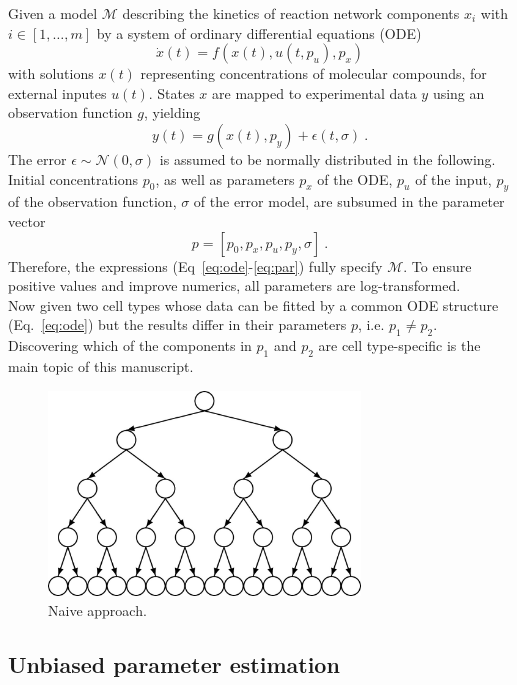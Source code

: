 \documentclass{bioinfo}
\begin{document}
Given a model $\mathcal M$ describing the kinetics of reaction network components $x_i$ with $i \in [1,\dots,m]$ by a system of ordinary differential equations (ODE)
\begin{equation}
\dot x(t) = f(x(t),u(t,p_u),p_x)\label{eq:ode}
\end{equation}
with solutions $x(t)$ representing concentrations of molecular compounds, for external inputes $u(t)$.
States $x$ are mapped to experimental data $y$ using an observation function $g$, yielding
\begin{equation}
y(t) = g(x(t),p_y)+\epsilon(t,\sigma) \:.\label{eq:obs}
\end{equation}
The error $\epsilon \sim \mathcal N(0,\sigma)$ is assumed to be normally distributed in the following.
Initial concentrations $p_0$, as well as parameters $p_x$ of the ODE, $p_u$ of the input, $p_y$ of the observation function, $\sigma$ of the error model, are subsumed in the parameter vector
\begin{equation}
p = [p_0, p_x, p_u, p_y, \sigma] \:.\label{eq:par}
\end{equation}
Therefore, the expressions (Eq~\ref{eq:ode}-\ref{eq:par}) fully specify $\mathcal M$.
To ensure positive values and improve numerics, all parameters are log-transformed.\\
Now given two cell types whose data can be fitted by a common ODE structure (Eq.~\ref{eq:ode}) but the results differ in their parameters $p$, i.e. $p_1 \neq p_2$.
Discovering which of the components in $p_1$ and $p_2$ are cell type-specific is the main topic of this manuscript.

\begin{figure}[!tpb]%
\centerline{\includegraphics[width=235pt]{Figures/tree.jpg}}
\caption{Naive approach.}\label{fig:01}
\end{figure}

\subsection{Unbiased parameter estimation}
\end{document}
